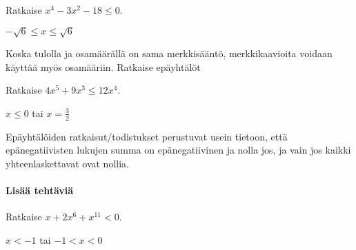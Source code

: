 \begin{tehtavasivu}
\begin{tehtava}
    Ratkaise $x^4-3x^2-18 \le 0$.
    \begin{vastaus}
        $-\sqrt{6}\le x \le \sqrt{6}$
    \end{vastaus}
\end{tehtava}

\begin{tehtava}
    Koska tulolla ja osamäärällä on sama merkkisääntö, merkkikaavioita
	voidaan käyttää myös osamääriin. Ratkaise epäyhtälöt
    \begin{alakohdat}
    \end{alakohdat}
    \begin{vastaus}
        \begin{alakohdat}
    	\end{alakohdat}
    \end{vastaus}
\end{tehtava}


\begin{tehtava}
    Ratkaise $4x^5+9 x^3 \le 12 x^4$.
    \begin{vastaus}
        $x\le0$ tai $x=\frac{3}{2}$
    \end{vastaus}
\end{tehtava}

\begin{tehtava}
Epäyhtälöiden ratkaisut/todistukset perustuvat usein tietoon, että epänegatiivisten lukujen summa on epänegatiivinen ja nolla jos, ja vain jos kaikki yhteenlaskettavat ovat nollia.

\begin{alakohdat}
\end{alakohdat}

\begin{vastaus}
\begin{alakohdat}
\end{alakohdat}
\end{vastaus}
\end{tehtava}

\paragraph*{Lisää tehtäviä}

\begin{tehtava}
    Ratkaise $x+2x^6+x^{11}<0$.
    \begin{vastaus}
        $x<-1$ tai $ -1<x<0$
    \end{vastaus}
\end{tehtava}

\end{tehtavasivu}
